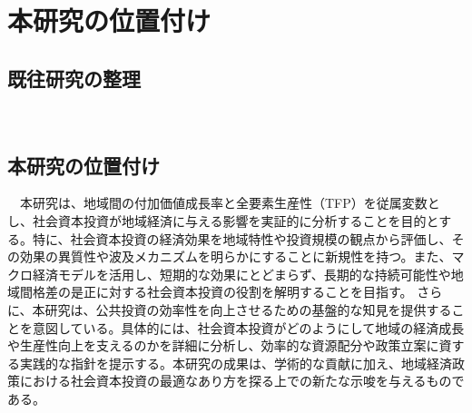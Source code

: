 \chapter{本研究の位置付け}

\section{既往研究の整理}
　
 
\section{本研究の位置付け}
　本研究は、地域間の付加価値成長率と全要素生産性（TFP）を従属変数とし、社会資本投資が地域経済に与える影響を実証的に分析することを目的とする。特に、社会資本投資の経済効果を地域特性や投資規模の観点から評価し、その効果の異質性や波及メカニズムを明らかにすることに新規性を持つ。また、マクロ経済モデルを活用し、短期的な効果にとどまらず、長期的な持続可能性や地域間格差の是正に対する社会資本投資の役割を解明することを目指す。
さらに、本研究は、公共投資の効率性を向上させるための基盤的な知見を提供することを意図している。具体的には、社会資本投資がどのようにして地域の経済成長や生産性向上を支えるのかを詳細に分析し、効率的な資源配分や政策立案に資する実践的な指針を提示する。本研究の成果は、学術的な貢献に加え、地域経済政策における社会資本投資の最適なあり方を探る上での新たな示唆を与えるものである。
